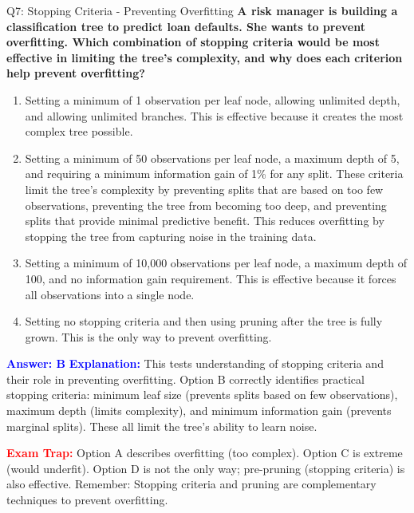 \documentclass[8pt]{beamer}
\begin{document}
	\begin{frame}{Q7: Stopping Criteria - Preventing Overfitting}
		\fontsize{6.5}{7.5}\selectfont
		\textbf{A risk manager is building a classification tree to predict loan defaults. She wants to prevent overfitting. Which combination of stopping criteria would be most effective in limiting the tree's complexity, and why does each criterion help prevent overfitting?}
		
		\begin{enumerate}
			\item Setting a minimum of 1 observation per leaf node, allowing unlimited depth, and allowing unlimited branches. This is effective because it creates the most complex tree possible.
			\item Setting a minimum of 50 observations per leaf node, a maximum depth of 5, and requiring a minimum information gain of 1\% for any split. These criteria limit the tree's complexity by preventing splits that are based on too few observations, preventing the tree from becoming too deep, and preventing splits that provide minimal predictive benefit. This reduces overfitting by stopping the tree from capturing noise in the training data.
			\item Setting a minimum of 10,000 observations per leaf node, a maximum depth of 100, and no information gain requirement. This is effective because it forces all observations into a single node.
			\item Setting no stopping criteria and then using pruning after the tree is fully grown. This is the only way to prevent overfitting.
		\end{enumerate}
		
		\vspace{0.1cm}
		\textcolor{blue}{\textbf{Answer: B}}
		\vspace{0.1cm}
		\textcolor{blue}{\textbf{Explanation:}} This tests understanding of stopping criteria and their role in preventing overfitting. Option B correctly identifies practical stopping criteria: minimum leaf size (prevents splits based on few observations), maximum depth (limits complexity), and minimum information gain (prevents marginal splits). These all limit the tree's ability to learn noise.
		
		\textcolor{red}{\textbf{Exam Trap:}} Option A describes overfitting (too complex). Option C is extreme (would underfit). Option D is not the only way; pre-pruning (stopping criteria) is also effective. Remember: Stopping criteria and pruning are complementary techniques to prevent overfitting.
	\end{frame}
	
\end{document}
